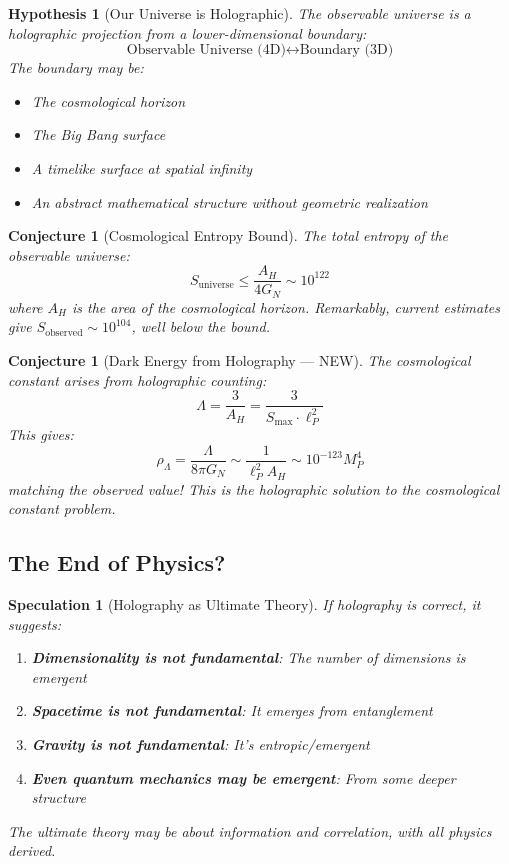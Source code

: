 \documentclass[12pt,a4paper]{article}
\newtheorem{conjecture}[theorem]{Conjecture}
\newtheorem{hypothesis}[theorem]{Hypothesis}
\newtheorem*{speculation}{Speculation}
\begin{document}
\begin{hypothesis}[Our Universe is Holographic]
The observable universe is a holographic projection from a lower-dimensional boundary:
\begin{equation}
\text{Observable Universe (4D)} \longleftrightarrow \text{Boundary (3D)}
\end{equation}
The boundary may be:
\begin{itemize}
    \item The cosmological horizon
    \item The Big Bang surface
    \item A timelike surface at spatial infinity
    \item An abstract mathematical structure without geometric realization
\end{itemize}
\end{hypothesis}

\begin{conjecture}[Cosmological Entropy Bound]
The total entropy of the observable universe:
\begin{equation}
S_{\text{universe}} \leq \frac{A_H}{4G_N} \sim 10^{122}
\end{equation}
where $A_H$ is the area of the cosmological horizon. Remarkably, current estimates give $S_{\text{observed}} \sim 10^{104}$, well below the bound.
\end{conjecture}

\begin{conjecture}[Dark Energy from Holography --- NEW]
The cosmological constant arises from holographic counting:
\begin{equation}
\Lambda = \frac{3}{A_H} = \frac{3}{S_{\text{max}} \cdot \ell_P^2}
\end{equation}
This gives:
\begin{equation}
\rho_\Lambda = \frac{\Lambda}{8\pi G_N} \sim \frac{1}{\ell_P^2 A_H} \sim 10^{-123} M_P^4
\end{equation}
matching the observed value! This is the holographic solution to the cosmological constant problem.
\end{conjecture}

\subsection{The End of Physics?}

\begin{speculation}[Holography as Ultimate Theory]
If holography is correct, it suggests:
\begin{enumerate}
    \item \textbf{Dimensionality is not fundamental}: The number of dimensions is emergent
    \item \textbf{Spacetime is not fundamental}: It emerges from entanglement
    \item \textbf{Gravity is not fundamental}: It's entropic/emergent
    \item \textbf{Even quantum mechanics may be emergent}: From some deeper structure
\end{enumerate}
The ultimate theory may be about \textit{information} and \textit{correlation}, with all physics derived.
\end{speculation}
\end{document}
